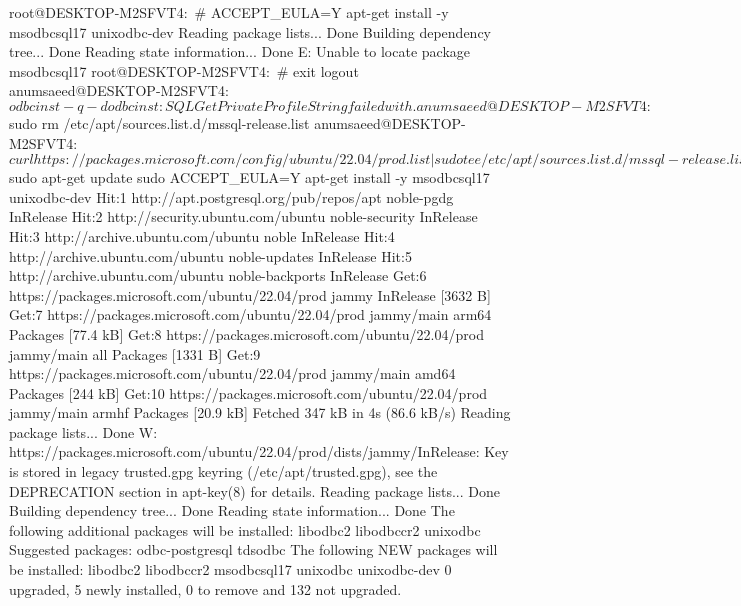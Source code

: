 root@DESKTOP-M2SFVT4:~# ACCEPT_EULA=Y apt-get install -y msodbcsql17 unixodbc-dev
Reading package lists... Done
Building dependency tree... Done
Reading state information... Done
E: Unable to locate package msodbcsql17
root@DESKTOP-M2SFVT4:~# exit
logout
anumsaeed@DESKTOP-M2SFVT4:~$ odbcinst -q -d
odbcinst: SQLGetPrivateProfileString failed with .
anumsaeed@DESKTOP-M2SFVT4:~$ sudo rm /etc/apt/sources.list.d/mssql-release.list
anumsaeed@DESKTOP-M2SFVT4:~$ curl https://packages.microsoft.com/config/ubuntu/22.04/prod.list | sudo tee /etc/apt/sources.list.d/mssql-release.list
                                 Dload  Upload   Total   Spent    Left  Speed
  0     0    0     0    0     0      0      0 --:--:-- --:--:-- --:--:--  0     0    0     0    0     0      0      0 --:--:-- --:--:-- --:--:--100    89  100    89    0     0     46      0  0:00:01  0:00:01 --:--:--100    89  100    89    0     0     46      0  0:00:01  0:00:01 --:--:--    46
deb [arch=amd64,arm64,armhf] https://packages.microsoft.com/ubuntu/22.04/prod jammy main
anumsaeed@DESKTOP-M2SFVT4:~$ sudo apt-get update
sudo ACCEPT_EULA=Y apt-get install -y msodbcsql17 unixodbc-dev
Hit:1 http://apt.postgresql.org/pub/repos/apt noble-pgdg InRelease
Hit:2 http://security.ubuntu.com/ubuntu noble-security InRelease
Hit:3 http://archive.ubuntu.com/ubuntu noble InRelease
Hit:4 http://archive.ubuntu.com/ubuntu noble-updates InRelease
Hit:5 http://archive.ubuntu.com/ubuntu noble-backports InRelease
Get:6 https://packages.microsoft.com/ubuntu/22.04/prod jammy InRelease [3632 B]
Get:7 https://packages.microsoft.com/ubuntu/22.04/prod jammy/main arm64 Packages [77.4 kB]
Get:8 https://packages.microsoft.com/ubuntu/22.04/prod jammy/main all Packages [1331 B]
Get:9 https://packages.microsoft.com/ubuntu/22.04/prod jammy/main amd64 Packages [244 kB]
Get:10 https://packages.microsoft.com/ubuntu/22.04/prod jammy/main armhf Packages [20.9 kB]
Fetched 347 kB in 4s (86.6 kB/s)
Reading package lists... Done
W: https://packages.microsoft.com/ubuntu/22.04/prod/dists/jammy/InRelease: Key is stored in legacy trusted.gpg keyring (/etc/apt/trusted.gpg), see the DEPRECATION section in apt-key(8) for details.
Reading package lists... Done
Building dependency tree... Done
Reading state information... Done
The following additional packages will be installed:
  libodbc2 libodbccr2 unixodbc
Suggested packages:
  odbc-postgresql tdsodbc
The following NEW packages will be installed:
  libodbc2 libodbccr2 msodbcsql17 unixodbc unixodbc-dev
0 upgraded, 5 newly installed, 0 to remove and 132 not upgraded.
